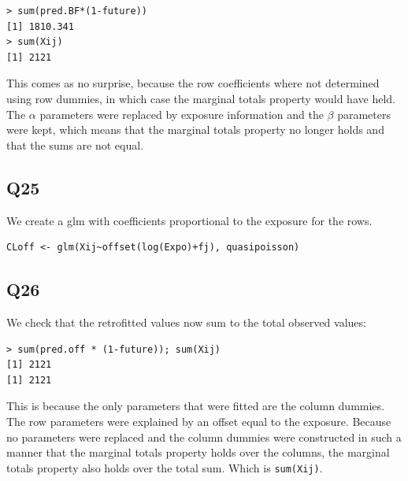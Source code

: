 \documentclass[11pt]{article}
\begin{document}
\begin{verbatim}
> sum(pred.BF*(1-future))
[1] 1810.341
> sum(Xij)
[1] 2121
\end{verbatim}

This comes as no surprise, because the row coefficients where not determined using row dummies, in which case the marginal totals property would have held. The $\alpha$ parameters were replaced by exposure information and the $\beta$ parameters were kept, which means that the marginal totals property no longer holds and that the sums are not equal.

\subsection*{Q25}

We create a glm with coefficients proportional to the exposure for the rows.

\begin{verbatim}
CLoff <- glm(Xij~offset(log(Expo)+fj), quasipoisson)
\end{verbatim}

\subsection*{Q26}

We check that the retrofitted values now sum to the total observed values:

\begin{verbatim}
> sum(pred.off * (1-future)); sum(Xij)
[1] 2121
[1] 2121
\end{verbatim}

This is because the only parameters that were fitted are the column dummies. The row parameters were explained by an offset equal to the exposure. Because no parameters were replaced and the column dummies were constructed in such a manner that the marginal totals property holds over the columns, the marginal totals property also holds over the total sum. Which is \verb|sum(Xij)|.
\end{document}

